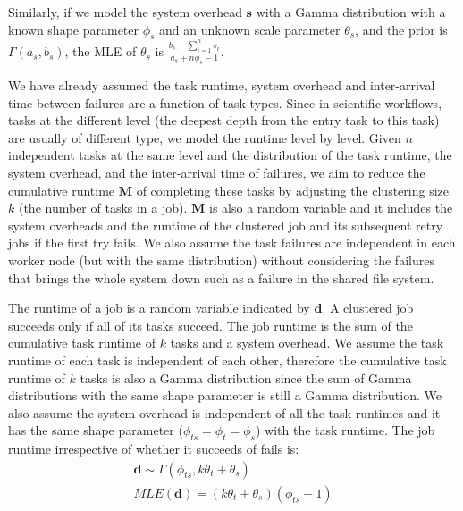 Similarly, if we model the system overhead $\bm s$ with a Gamma distribution with a known shape parameter $\phi_{s}$ and an unknown scale parameter $\theta_s$, and the prior is $\Gamma(a_s, b_s)$, the MLE of $\theta_s$ is $\displaystyle\frac{b_s+\displaystyle\sum_{i=1}^n{s_i}}{a_s+n\phi_s-1}$.

We have already assumed the task runtime, system overhead and inter-arrival time between failures are a function of task types. Since in scientific workflows, tasks at the different level (the deepest depth from the entry task to this task) are usually of different type, we model the runtime level by level. Given $n$ independent tasks at the same level and the distribution of the task runtime, the system overhead, and the inter-arrival time of failures, we aim to reduce the cumulative runtime $\bm M$ of completing these tasks by adjusting the clustering size $k$ (the number of tasks in a job). 
$\bm M$ is also a random variable and it includes the system overheads and the runtime of the clustered job and its subsequent retry jobs if the first try fails. We also assume the task failures are independent in each worker node (but with the same distribution) without considering the failures that brings the whole system down such as a failure in the shared file system. 

The runtime of a job is a random variable indicated by $\bm d$. A clustered job succeeds only if all of its tasks succeed. The job runtime is the sum of the cumulative task runtime of $k$ tasks and a system overhead. We assume the task runtime of each task is independent of each other, therefore the cumulative task runtime of $k$ tasks is also a Gamma distribution since the sum of Gamma distributions with the same shape parameter is still a Gamma distribution. We also assume the system overhead is independent of all the task runtimes and it has the same shape parameter ($\phi_{ts}=\phi_{t}=\phi_{s}$) with the task runtime. 
The job runtime irrespective of whether it succeeds of fails is:
\begin{eqnarray}
\displaystyle
\bm{d}\sim\Gamma(\phi_{ts}, k\theta_t+\theta_s)\\
MLE(\bm{d})=\displaystyle{(k\theta_t+\theta_s) }{(\phi_{ts}-1)}
\label{eq:N}
\end{eqnarray}

